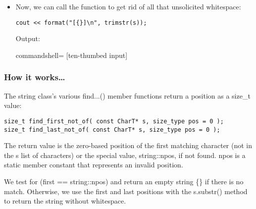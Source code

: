 \begin{itemize}
\item 
Now, we can call the function to get rid of all that unsolicited whitespace:

\begin{lstlisting}[style=styleCXX]
cout << format("[{}]\n", trimstr(s));
\end{lstlisting}

Output:

\begin{tcblisting}{commandshell={}}
[ten-thumbed input]
\end{tcblisting}
\end{itemize}


\subsubsection{How it works…}

The string class's various find...() member functions return a position as a size\_t value:

\begin{lstlisting}[style=styleCXX]
size_t find_first_not_of( const CharT* s, size_type pos = 0 );
size_t find_last_not_of( const CharT* s, size_type pos = 0 );
\end{lstlisting}

The return value is the zero-based position of the first matching character (not in the s list of characters) or the special value, string::npos, if not found. npos is a static member constant that represents an invalid position.

We test for (first == string::npos) and return an empty string \{\} if there is no match. Otherwise, we use the first and last positions with the s.substr() method to return the string without whitespace.














